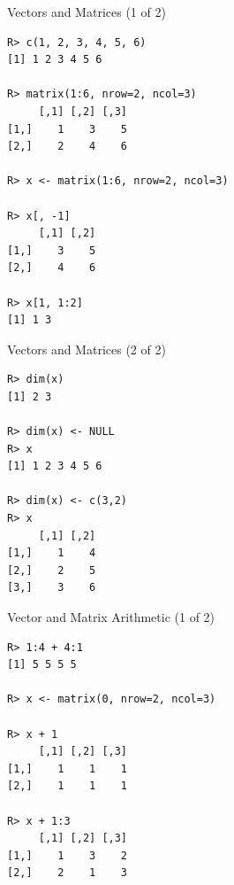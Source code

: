 \begin{frame}
  \begin{exampleblock}{Vectors and Matrices (1 of 2)}\pause
  
\begin{lstlisting}[backgroundcolor=\color{white},basicstyle=\ttfamily\color{
dkgray}\scriptsize,keywordstyle=\color{black}, 
  commentstyle=\color{orange},stringstyle=\color{mauve}]
R> c(1, 2, 3, 4, 5, 6)
[1] 1 2 3 4 5 6

R> matrix(1:6, nrow=2, ncol=3)
     [,1] [,2] [,3]
[1,]    1    3    5
[2,]    2    4    6

R> x <- matrix(1:6, nrow=2, ncol=3)

R> x[, -1]
     [,1] [,2]
[1,]    3    5
[2,]    4    6

R> x[1, 1:2]
[1] 1 3
\end{lstlisting}
  \end{exampleblock}
\end{frame}


\begin{frame}[fragile]
  \begin{exampleblock}{Vectors and Matrices (2 of 2)}\pause
  
\begin{lstlisting}[backgroundcolor=\color{white},basicstyle=\ttfamily\color{
dkgray}\scriptsize,keywordstyle=\color{black}, 
  commentstyle=\color{orange},stringstyle=\color{mauve}]
R> dim(x)
[1] 2 3

R> dim(x) <- NULL
R> x
[1] 1 2 3 4 5 6

R> dim(x) <- c(3,2)
R> x
     [,1] [,2]
[1,]    1    4
[2,]    2    5
[3,]    3    6
\end{lstlisting}
  \end{exampleblock}
\end{frame}


\begin{frame}[fragile]
  \begin{exampleblock}{Vector and Matrix Arithmetic (1 of 2)}\pause
  
\begin{lstlisting}[backgroundcolor=\color{white},basicstyle=\ttfamily\color{
dkgray}\scriptsize,keywordstyle=\color{black}, 
  commentstyle=\color{orange},stringstyle=\color{mauve}]
R> 1:4 + 4:1
[1] 5 5 5 5

R> x <- matrix(0, nrow=2, ncol=3)

R> x + 1
     [,1] [,2] [,3]
[1,]    1    1    1
[2,]    1    1    1

R> x + 1:3
     [,1] [,2] [,3]
[1,]    1    3    2
[2,]    2    1    3

\end{lstlisting}
  \end{exampleblock}
\end{frame}



